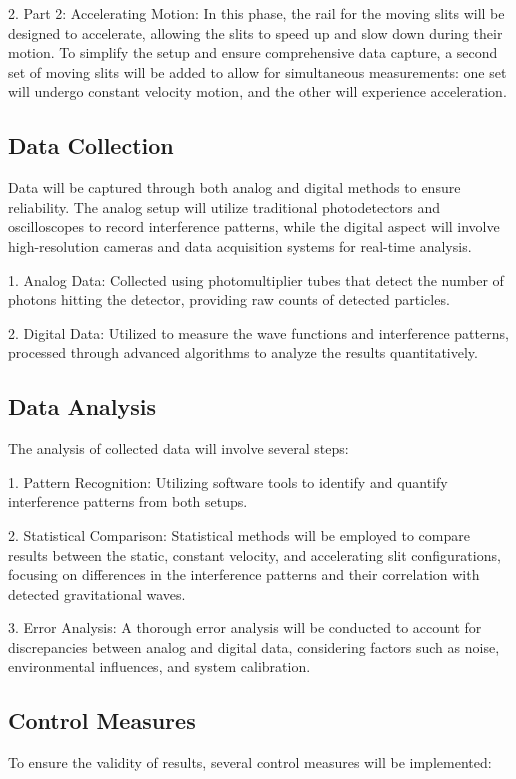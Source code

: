 \documentclass{article}
\begin{document}
2. Part 2: Accelerating Motion: In this phase, the rail for the moving slits will be designed to accelerate, allowing the slits to speed up and slow down during their motion. To simplify the setup and ensure comprehensive data capture, a second set of moving slits will be added to allow for simultaneous measurements: one set will undergo constant velocity motion, and the other will experience acceleration.

\subsection{Data Collection}
Data will be captured through both analog and digital methods to ensure reliability. The analog setup will utilize traditional photodetectors and oscilloscopes to record interference patterns, while the digital aspect will involve high-resolution cameras and data acquisition systems for real-time analysis.

1. Analog Data: Collected using photomultiplier tubes that detect the number of photons hitting the detector, providing raw counts of detected particles.

2. Digital Data: Utilized to measure the wave functions and interference patterns, processed through advanced algorithms to analyze the results quantitatively.

\subsection{Data Analysis}
The analysis of collected data will involve several steps:

1. Pattern Recognition: Utilizing software tools to identify and quantify interference patterns from both setups.

2. Statistical Comparison: Statistical methods will be employed to compare results between the static, constant velocity, and accelerating slit configurations, focusing on differences in the interference patterns and their correlation with detected gravitational waves.

3. Error Analysis: A thorough error analysis will be conducted to account for discrepancies between analog and digital data, considering factors such as noise, environmental influences, and system calibration.

\subsection{Control Measures}
To ensure the validity of results, several control measures will be implemented:
\end{document}
